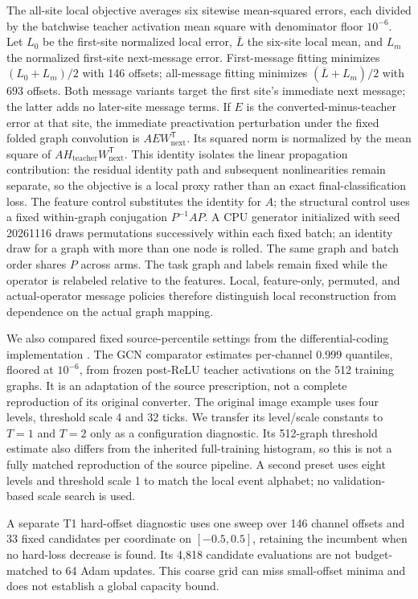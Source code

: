 \documentclass{article}
\begin{document}
The all-site local objective averages six sitewise mean-squared errors, each divided by the batchwise teacher activation mean square with denominator floor $10^{-6}$. Let $L_0$ be the first-site normalized local error, $\overline L$ the six-site local mean, and $L_m$ the normalized first-site next-message error. First-message fitting minimizes $(L_0+L_m)/2$ with 146 offsets; all-message fitting minimizes $(\overline L+L_m)/2$ with 693 offsets. Both message variants target the first site's immediate next message; the latter adds no later-site message terms. If $E$ is the converted-minus-teacher error at that site, the immediate preactivation perturbation under the fixed folded graph convolution is $A E W_{\mathrm{next}}^{\mathsf T}$. Its squared norm is normalized by the mean square of $A H_{\mathrm{teacher}}W_{\mathrm{next}}^{\mathsf T}$. This identity isolates the linear propagation contribution: the residual identity path and subsequent nonlinearities remain separate, so the objective is a local proxy rather than an exact final-classification loss. The feature control substitutes the identity for $A$; the structural control uses a fixed within-graph conjugation $P^{-1}AP$. A CPU generator initialized with seed 20261116 draws permutations successively within each fixed batch; an identity draw for a graph with more than one node is rolled. The same graph and batch order shares $P$ across arms. The task graph and labels remain fixed while the operator is relabeled relative to the features. Local, feature-only, permuted, and actual-operator message policies therefore distinguish local reconstruction from dependence on the actual graph mapping.

We also compared fixed source-percentile settings from the differential-coding implementation \cite{huang2025}. The GCN comparator estimates per-channel 0.999 quantiles, floored at $10^{-6}$, from frozen post-ReLU teacher activations on the 512 training graphs. It is an adaptation of the source prescription, not a complete reproduction of its original converter. The original image example uses four levels, threshold scale 4 and 32 ticks. We transfer its level/scale constants to $T=1$ and $T=2$ only as a configuration diagnostic. Its 512-graph threshold estimate also differs from the inherited full-training histogram, so this is not a fully matched reproduction of the source pipeline. A second preset uses eight levels and threshold scale 1 to match the local event alphabet; no validation-based scale search is used.

A separate T1 hard-offset diagnostic uses one sweep over 146 channel offsets and 33 fixed candidates per coordinate on $[-0.5,0.5]$, retaining the incumbent when no hard-loss decrease is found. Its 4,818 candidate evaluations are not budget-matched to 64 Adam updates. This coarse grid can miss small-offset minima and does not establish a global capacity bound.
\end{document}
